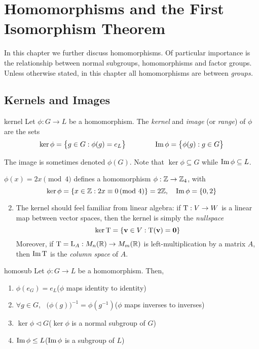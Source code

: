 \graphicspath{{7homo/asy/}}

\section{Homomorphisms and the First Isomorphism Theorem}\label{chap:homo}


In this chapter we further discuss homomorphisms. Of particular importance is the relationship between normal subgroups, homomorphisms and factor groups.\smallbreak
Unless otherwise stated, in this chapter all homomorphisms are between \emph{groups.}

\subsection{Kernels and Images}\label{sec:kerimage}

\begin{defn}{}{kernel}
Let $\phi:G\to L$ be a homomorphism. The \emph{kernel} and \emph{image} (or \emph{range}) of $\phi$ are the sets
\begin{gather*}
\ker\phi=\bigl\{g\in G:\phi(g)=e_L\bigr\}\qquad\qquad\operatorname{Im}\phi=\bigl\{\phi(g):g\in G\bigr\}
\end{gather*}
\end{defn}

The image is sometimes denoted $\phi(G)$. Note that $\ker\phi\subseteq G$ while $\operatorname{Im}\phi\subseteq L$.

\begin{examples}{}{}
\exstart $\phi(x)=2x\pmod 4$ defines a homomorphism $\phi:\mathbb{Z}\to\mathbb{Z}_4$, with
\[\ker\phi=\{x\in\mathbb{Z}:2x\equiv 0\negthickspace\pmod 4\}=2\mathbb{Z},\quad \operatorname{Im}\phi=\{0,2\}\]
\begin{enumerate}\setcounter{enumi}{1}
  \item The kernel should feel familiar from linear algebra: if $\mathrm{T}:V\to W$ is a linear map between vector spaces, then the kernel is simply the \emph{nullspace}
	\[\ker\mathrm{T}=\{{\mathbf{v}}\in V:\mathrm{T}({\mathbf{v}})=\mathbf{0}\}\]
	Moreover, if $\mathrm{T}=\mathrm{L}_A:M_n(\mathbb{R})\to M_m(\mathbb{R})$ is left-multiplication by a matrix $A$, then $\operatorname{Im}\mathrm{T}$ is the \emph{column space} of $A$.
\end{enumerate}
\end{examples}



\begin{lemm}{}{homosub}
Let $\phi:G\to L$ be a homomorphism. Then,
\begin{enumerate}
  \item $\phi(e_G)=e_L$\hfill ($\phi$ maps identity to identity)
  \item $\forall g\in G$, \ $\bigl(\phi(g)\bigr)^{-1}=\phi(g^{-1})$\hfill($\phi$ maps inverses to inverses)
  \item $\ker\phi\triangleleft G$\hfill($\ker\phi$ is a normal subgroup of $G$)
  \item $\operatorname{Im}\phi\le L$\hfill($\operatorname{Im}\phi$ is a subgroup of $L$)
\end{enumerate}
\end{lemm}

